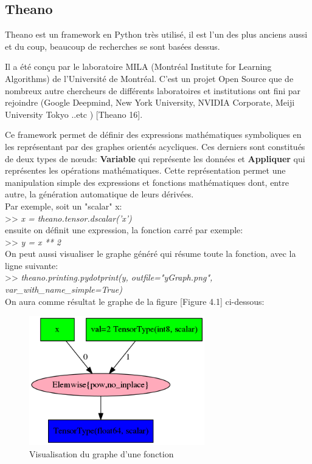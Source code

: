 \subsection{Theano}
	Theano est un framework en Python très utilisé, il est l'un des plus anciens aussi et du coup, beaucoup de recherches se sont basées dessus. 

	Il a été conçu par le laboratoire MILA (Montréal Institute for Learning Algorithms) de l’Université de Montréal. C'est un projet Open Source que de nombreux autre chercheurs de différents laboratoires et institutions ont fini par rejoindre (Google Deepmind, New  York  University, NVIDIA Corporate, Meiji  University Tokyo ..etc ) [Theano 16].

	Ce framework permet de définir des expressions mathématiques symboliques en les représentant par des graphes orientés acycliques. Ces derniers sont constitués de deux types de nœuds: \textbf{Variable} qui représente les données et \textbf{Appliquer} qui représentes les opérations mathématiques. Cette représentation permet une manipulation simple des expressions et fonctions mathématiques dont, entre autre, la génération automatique de leurs dérivées.\\

Par exemple, soit un "scalar" x: \\

>> \textit{x = theano.tensor.dscalar('x')}\\

ensuite on définit une expression, la fonction carré par exemple: \\

>> \textit{y = x ** 2}\\

	On peut aussi visualiser le graphe généré qui résume toute la fonction, avec la ligne suivante:\\

>> \textit{theano.printing.pydotprint(y, outfile="yGraph.png", var\_with\_name\_simple=True)}\\

On aura comme résultat le graphe de la figure [Figure 4.1] ci-dessous:

\begin{figure}[H]
	\centering
		\includegraphics[width=3in]{Figures/yGraph.png}
	\caption[TheanoGraph]{Visualisation du graphe d'une fonction}
	\label{fig:Electron}
\end{figure}

